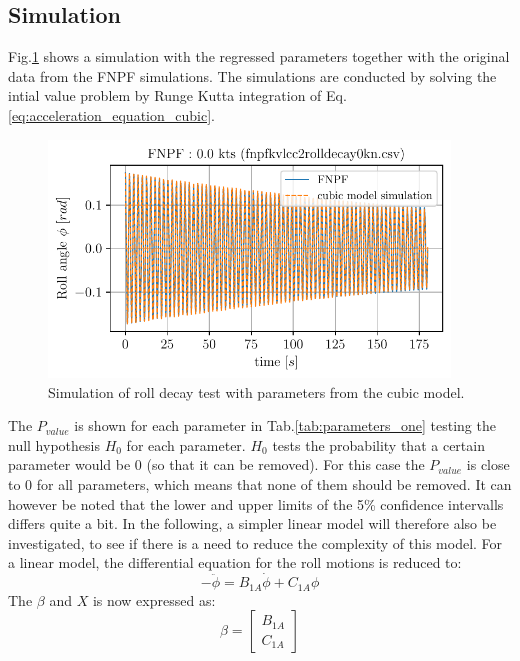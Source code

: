 \subsection*{Simulation}\label{simulation}
Fig.\ref{fig:sim_cubic} shows a simulation with the regressed
parameters together with the original data from the FNPF simulations.
The simulations are conducted by solving the intial value problem by
Runge Kutta integration of
Eq.\ref{eq:acceleration_equation_cubic}.
\begin{figure}[H]
\begin{center}\includegraphics[width = 0.95\textwidth]{figures/sim_cubic.pdf}\end{center}
\vspace{-0.7cm}
\caption{Simulation of roll decay test with parameters from the cubic model.}
\label{fig:sim_cubic}
\end{figure}
The $P_{value}$ is shown for each parameter in
Tab.\ref{tab:parameters_one} testing the null hypothesis $H_0$
for each parameter. $H_0$ tests the probability that a certain
parameter would be 0 (so that it can be removed). For this case the
$P_{value}$ is close to 0 for all parameters, which means that none of
them should be removed.
It can however be noted that the lower and upper limits of the 5\%
confidence intervalls differs quite a bit. In the following, a simpler
linear model will therefore also be investigated, to see if there is a
need to reduce the complexity of this model. For a linear model, the
differential equation for the roll motions is reduced to:
\begin{equation}
- \ddot{\phi} = B_{1A} \dot{\phi} + C_{1A} \phi
\label{eq:Eq(-Derivative(phi(t), (t, 2)), B_1A*Derivative(phi(t), t) + C_1A*phi(t))}
\end{equation}
The $\beta$ and $X$ is now expressed as:
\begin{equation}
\beta = \left[\begin{matrix}B_{1A}\\C_{1A}\end{matrix}\right]
\label{eq:eq_beta2}
\end{equation}
